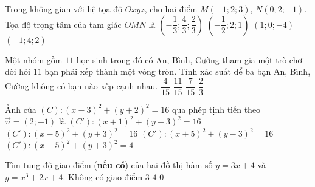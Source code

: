 \begin{ex}%
Trong không gian với hệ tọa độ $Oxyz$, cho hai điểm $M(-1;2;3)$, $N(0;2;-1)$. Tọa độ trọng tâm của tam giác $OMN$ là
\choice
{\True $\left(-\dfrac{1}{3};\dfrac{4}{3};\dfrac{2}{3}\right)$}
{$\left(-\dfrac{1}{2};2;1\right)$}
{$(1;0;-4)$}
{$(-1;4;2)$}
\end{ex}


\begin{ex}%
Một nhóm gồm $11$ học sinh trong đó có An, Bình, Cường tham gia một trò chơi đòi hỏi $11$ bạn phải xếp thành một vòng tròn. Tính xác suất để ba bạn An, Bình, Cường không có bạn nào xếp cạnh nhau.
\choice
{$\dfrac{4}{15}$}
{$\dfrac{11}{15}$}
{\True $\dfrac{7}{15}$}
{$\dfrac{2}{3}$}
\end{ex}

\begin{ex}%
Ảnh của $(C)\colon (x-3)^2+(y+2)^2=16$ qua phép tịnh tiến theo $\vec{u}=(2;-1)$ là
\choice
{$(C')\colon(x+1)^2+(y-3)^2=16$}
{\True $(C')\colon(x-5)^2+(y+3)^2=16$}
{$(C')\colon(x+5)^2+(y-3)^2=16$}
{$(C')\colon(x-5)^2+(y+3)^2=4$}
\end{ex}

\begin{ex}%
Tìm tung độ giao điểm (\textbf{nếu có}) của hai đồ thị hàm số $y=3x+4$ và $y=x^3+2x+4$.
\choice
{Không có giao điểm}
{$3$}
{\True $4$}
{$0$}
\end{ex}

